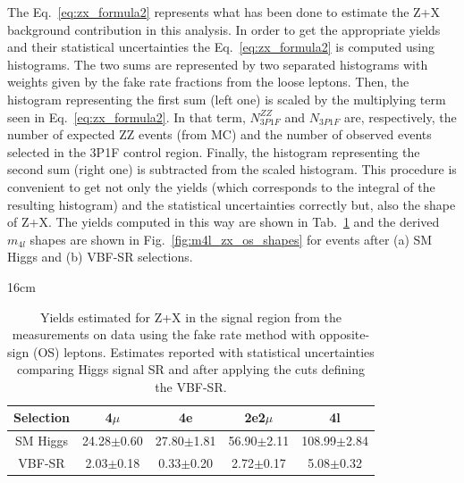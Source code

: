The Eq.~\ref{eq:zx_formula2} represents what has been done to estimate the Z+X background contribution in this analysis. In order to get the appropriate yields and their statistical uncertainties the Eq.~\ref{eq:zx_formula2} is computed using histograms. The two sums are represented by two separated histograms with weights given by the fake rate fractions from the loose leptons. Then, the histogram representing the first sum (left one) is scaled by the multiplying term seen in Eq.~\ref{eq:zx_formula2}. In that term, $N^{ZZ}_{3P1F}$ and $N_{3P1F}$ are, respectively, the number of expected ZZ events (from MC) and the number of observed events selected in the 3P1F control region. Finally, the histogram representing the second sum (right one) is subtracted from the scaled histogram. This procedure is convenient to get not only the yields (which corresponds to the integral of the resulting histogram) and the statistical uncertainties correctly but, also the shape of Z+X. The yields computed in this way are shown in Tab.~\ref{tab:zx_os_yields} and the derived $m_{4l}$ shapes are shown in Fig.~\ref{fig:m4l_zx_os_shapes} for events after (a) SM Higgs and (b) VBF-SR selections.

\begin{table}[hbtp]{16cm}
	\centering
	\caption{Yields estimated for Z+X in the signal region from the measurements on data using the fake rate method with opposite-sign (OS) leptons. Estimates reported with statistical uncertainties comparing Higgs signal SR and after applying the cuts defining the VBF-SR.}
	\begin{tabular}{c|c|c|c|c}
		\hline
		\rowcolor{light_gray}
		Selection & 4$\mu$         & 4e             & 2e2$\mu$       & 4l\\
		\hline
		SM Higgs  & 24.28$\pm$0.60 & 27.80$\pm$1.81 & 56.90$\pm$2.11 & 108.99$\pm$2.84\\
		VBF-SR    &  2.03$\pm$0.18 &  0.33$\pm$0.20 &  2.72$\pm$0.17 &   5.08$\pm$0.32\\
		\hline
	\end{tabular}
	\label{tab:zx_os_yields}
\end{table}


